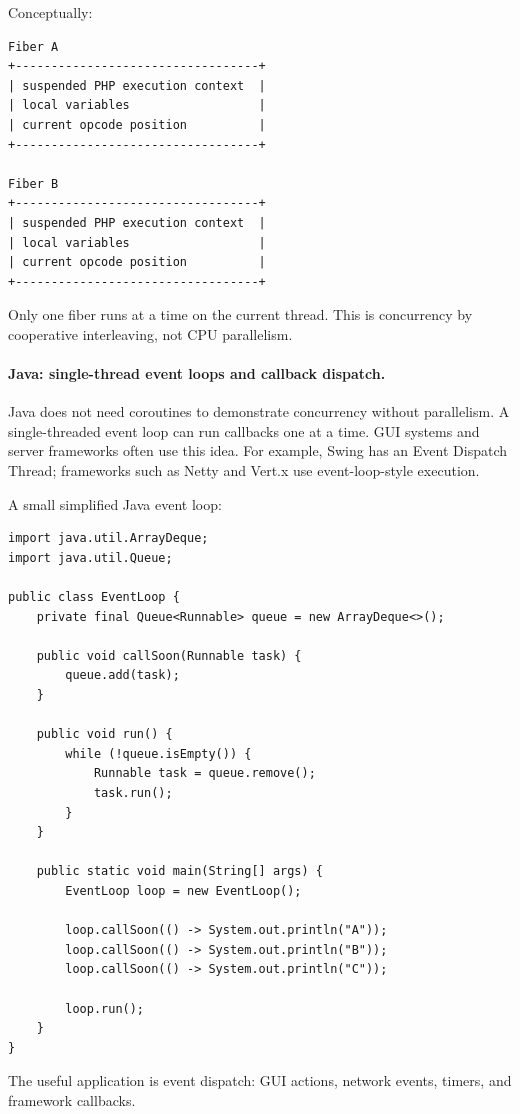 Conceptually:

\begin{verbatim}
Fiber A
+----------------------------------+
| suspended PHP execution context  |
| local variables                  |
| current opcode position          |
+----------------------------------+

Fiber B
+----------------------------------+
| suspended PHP execution context  |
| local variables                  |
| current opcode position          |
+----------------------------------+
\end{verbatim}

Only one fiber runs at a time on the current thread. This is concurrency by cooperative interleaving, not CPU parallelism.

\paragraph{Java: single-thread event loops and callback dispatch.}

Java does not need coroutines to demonstrate concurrency without parallelism. A single-threaded event loop can run callbacks one at a time. GUI systems and server frameworks often use this idea. For example, Swing has an Event Dispatch Thread; frameworks such as Netty and Vert.x use event-loop-style execution.

A small simplified Java event loop:

\begin{verbatim}
import java.util.ArrayDeque;
import java.util.Queue;

public class EventLoop {
    private final Queue<Runnable> queue = new ArrayDeque<>();

    public void callSoon(Runnable task) {
        queue.add(task);
    }

    public void run() {
        while (!queue.isEmpty()) {
            Runnable task = queue.remove();
            task.run();
        }
    }

    public static void main(String[] args) {
        EventLoop loop = new EventLoop();

        loop.callSoon(() -> System.out.println("A"));
        loop.callSoon(() -> System.out.println("B"));
        loop.callSoon(() -> System.out.println("C"));

        loop.run();
    }
}
\end{verbatim}

The useful application is event dispatch: GUI actions, network events, timers, and framework callbacks.

